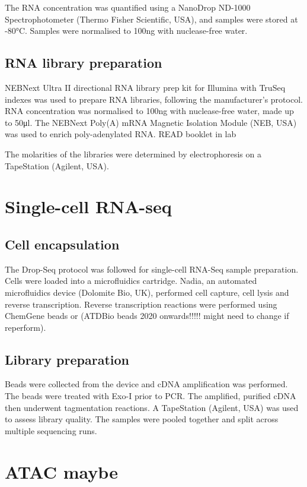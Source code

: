 The RNA concentration was quantified using a NanoDrop ND-1000 Spectrophotometer (Thermo Fisher Scientific, USA), and samples were stored at -80\si{\degreeCelsius}.
Samples were normalised to 100\si{\ng} with nuclease-free water.


\subsection{RNA library preparation}
NEBNext\textsuperscript{\textregistered} Ultra II directional RNA library prep kit for Illumina\textsuperscript{\textregistered} with TruSeq indexes was used to prepare RNA libraries, following the manufacturer's protocol.
RNA concentration was normalised to 100\si{\ng} with nuclease-free water, made up to 50\si{\ul}.
The NEBNext Poly(A) mRNA Magnetic Isolation Module (NEB, USA) was used to enrich poly-adenylated RNA. READ booklet in lab


The molarities of the libraries were determined by electrophoresis on a TapeStation (Agilent, USA).

\section{Single-cell RNA-seq}
\subsection{Cell encapsulation}
The Drop-Seq protocol\cite{macosko2015highly} was followed for single-cell RNA-Seq sample preparation.
Cells were loaded into a microfluidics cartridge.
Nadia, an automated microfluidics device (Dolomite Bio, UK), performed cell capture, cell lysis and reverse transcription.
Reverse transcription reactions were performed using ChemGene beads or (ATDBio beads 2020 onwards!!!!! might need to change if reperform).

\subsection{Library preparation}
Beads were collected from the device and cDNA amplification was performed.
The beads were treated with Exo-I prior to PCR.
The amplified, purified cDNA then underwent tagmentation reactions.
A TapeStation (Agilent, USA) was used to assess library quality.
The samples were pooled together and split across multiple sequencing runs.


\section{ATAC maybe}
